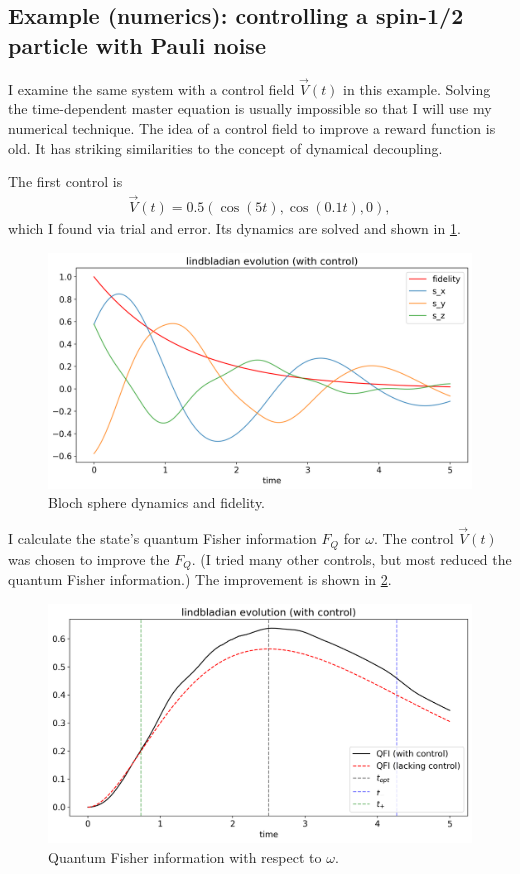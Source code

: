 \documentclass[12pt]{article}
\begin{document}
\subsection{Example (numerics): controlling a spin-1/2 particle with Pauli noise}

I examine the same system with a control field $\vec{V}(t)$ in this example. Solving the time-dependent master equation is usually impossible so that I will use my numerical technique. The idea of a control field to improve a reward function is old. It has striking similarities to the concept of dynamical decoupling. 

The first control is
\begin{align}
    \vec{V}(t) = 0.5 (\cos(5 t), \cos(0.1 t), 0),
\end{align}
which I found via trial and error. Its dynamics are solved and shown in \ref{fig: bloch_yes_control}.
\begin{figure}[ht]
    \centering
    \includegraphics[width=12cm]{bloch_yes_control.png}
    \caption{Bloch sphere dynamics and fidelity.}
    \label{fig: bloch_yes_control}
    \centering
\end{figure}
I calculate the state's quantum Fisher information $F_Q$ for $\omega$. The control $\vec{V}(t)$ was chosen to improve the $F_Q$. (I tried many other controls, but most reduced the quantum Fisher information.) The improvement is shown in \ref{fig: info_yes_control}.
\begin{figure}[ht]
    \centering
    \includegraphics[width=12cm]{info_yes_control.png}
    \caption{Quantum Fisher information with respect to $\omega$.}
    \label{fig: info_yes_control}
    \centering
\end{figure}
\end{document}

